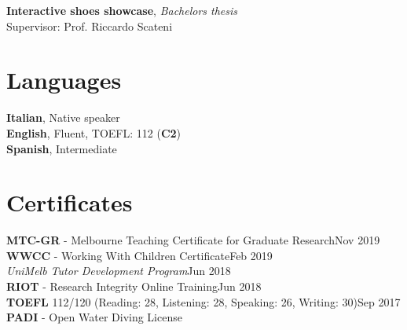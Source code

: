 \documentclass[margin]{res}
\begin{document}
\begin{resume}
\textbf{Interactive shoes showcase}, \textit{Bachelors thesis}\\
Supervisor: Prof. Riccardo Scateni




\section{Languages}
\par

\textbullet{} \textbf{Italian}, Native speaker \\
\textbullet{} \textbf{English}, Fluent, TOEFL: 112 (\textbf{C2}) \\
\textbullet{} \textbf{Spanish}, Intermediate\\

\section{Certificates}
\par
\textbullet{} \textbf{MTC-GR} - Melbourne Teaching Certificate for Graduate Research\hfill{Nov 2019}\\
\textbullet{} \textbf{WWCC} - Working With Children Certificate\hfill{Feb 2019}\\
\textbullet{} \textit{UniMelb Tutor Development Program}\hfill{Jun 2018}\\
\textbullet{} \textbf{RIOT} - Research Integrity Online Training\hfill{Jun 2018}\\
\textbullet{} \textbf{TOEFL} 112/120 (Reading: 28, Listening: 28, Speaking: 26, Writing: 30)\hfill{Sep 2017}\\
\textbullet{} \textbf{PADI} - Open Water Diving License


\end{resume}
\end{document}
